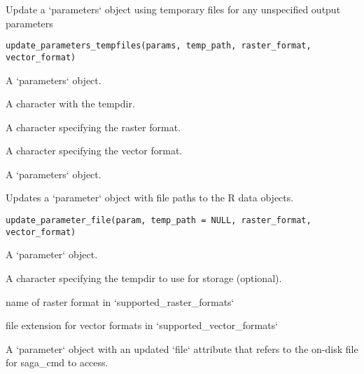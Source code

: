 \documentclass[a4paper]{book}
\begin{document}
%
\begin{Description}
Update a `parameters` object using temporary files for any unspecified output
parameters
\end{Description}
%
\begin{Usage}
\begin{verbatim}
update_parameters_tempfiles(params, temp_path, raster_format, vector_format)
\end{verbatim}
\end{Usage}
%
\begin{Arguments}
\begin{ldescription}
\item[\code{params}] A `parameters` object.

\item[\code{temp\_path}] A character with the tempdir.

\item[\code{raster\_format}] A character specifying the raster format.

\item[\code{vector\_format}] A character specifying the vector format.
\end{ldescription}
\end{Arguments}
%
\begin{Value}
A `parameters` object.
\end{Value}
%
\begin{Description}
Updates a `parameter` object with file paths to the R data objects.
\end{Description}
%
\begin{Usage}
\begin{verbatim}
update_parameter_file(param, temp_path = NULL, raster_format, vector_format)
\end{verbatim}
\end{Usage}
%
\begin{Arguments}
\begin{ldescription}
\item[\code{param}] A `parameter` object.

\item[\code{temp\_path}] A character specifying the tempdir to use for storage
(optional).

\item[\code{raster\_format}] name of raster format in `supported\_raster\_formats`

\item[\code{vector\_format}] file extension for vector formats in
`supported\_vector\_formats`
\end{ldescription}
\end{Arguments}
%
\begin{Value}
A `parameter` object with an updated `file` attribute that refers to
the on-disk file for saga\_cmd to access.
\end{Value}
\printindex{}
\end{document}
